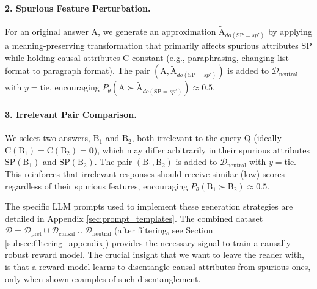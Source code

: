 \paragraph{2. Spurious Feature Perturbation.}
For an original answer $\mathrm{A}$, we generate an approximation $\tilde{\mathrm{A}}_{do(\mathrm{SP}=sp')}$ by applying a meaning-preserving transformation that primarily affects spurious attributes $\mathrm{SP}$ while holding causal attributes $\mathrm{C}$ constant (e.g., paraphrasing, changing list format to paragraph format). The pair $(\mathrm{A}, \tilde{\mathrm{A}}_{do(\mathrm{SP}=sp')})$ is added to $\mathcal{D}_{\mathrm{neutral}}$ with $y=\text{tie}$, encouraging $P_\theta(\mathrm{A} \succ \tilde{\mathrm{A}}_{do(\mathrm{SP}=sp')}) \approx 0.5$.

\paragraph{3. Irrelevant Pair Comparison.}
We select two answers, $\mathrm{B}_1$ and $\mathrm{B}_2$, both irrelevant to the query $\mathrm{Q}$ (ideally $\mathrm{C}(\mathrm{B}_1) = \mathrm{C}(\mathrm{B}_2) = \mathbf{0}$), which may differ arbitrarily in their spurious attributes $\mathrm{SP}(\mathrm{B}_1)$ and $\mathrm{SP}(\mathrm{B}_2)$. The pair $(\mathrm{B}_1, \mathrm{B}_2)$ is added to $\mathcal{D}_{\mathrm{neutral}}$ with $y=\text{tie}$. This reinforces that irrelevant responses should receive similar (low) scores regardless of their spurious features, encouraging $P_\theta(\mathrm{B}_1 \succ \mathrm{B}_2) \approx 0.5$.

The specific LLM prompts used to implement these generation strategies are detailed in Appendix \ref{sec:prompt_templates}. The combined dataset $\mathcal{D} = \mathcal{D}_{\mathrm{pref}} \cup \mathcal{D}_{\mathrm{causal}} \cup \mathcal{D}_{\mathrm{neutral}}$ (after filtering, see Section \ref{subsec:filtering_appendix}) provides the necessary signal to train a causally robust reward model.
The crucial insight that we want to leave the reader with, is that a reward model learns to disentangle causal attributes from spurious ones, only when shown examples of such disentanglement.